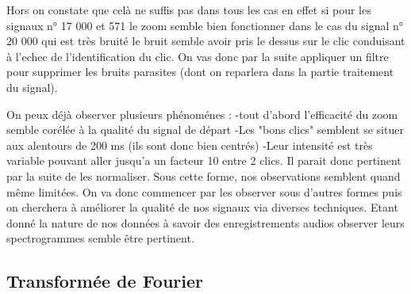Hors on constate que celà ne suffis pas dans tous les cas en effet si pour les signaux n° 17 000 et 571 le zoom semble bien fonctionner dans le cas du signal n° 20 000 qui est très bruité le bruit semble avoir pris le dessus sur le clic conduisant à l'echec de l'identification du clic.
On vas donc par la suite appliquer un filtre pour supprimer les bruits parasites (dont on reparlera dans la partie traitement du signal).

On peux déjà observer plusieurs phénoménes :
-tout d'abord l'efficacité du zoom semble corélée à la qualité du signal de départ
-Les "bons clics" semblent se situer aux alentours de 200 ms (ils sont donc bien centrés)
-Leur intensité est très  variable pouvant aller jusqu'a un facteur 10 entre 2 clics. Il parait donc pertinent par la suite de les normaliser.
Sous cette forme, nos observations semblent quand même limitées. On va donc commencer par les observer sous d'autres formes puis on cherchera à améliorer la qualité de nos signaux via diverses techniques. Etant donné la nature de nos données à savoir des enregistrements audios observer leurs spectrogrammes semble être pertinent.

\hypertarget{Transformuxe9-de-Fourier}{%
\subsection{Transformée de Fourier}
\label{Transformuxe9-de-Fourier}}

